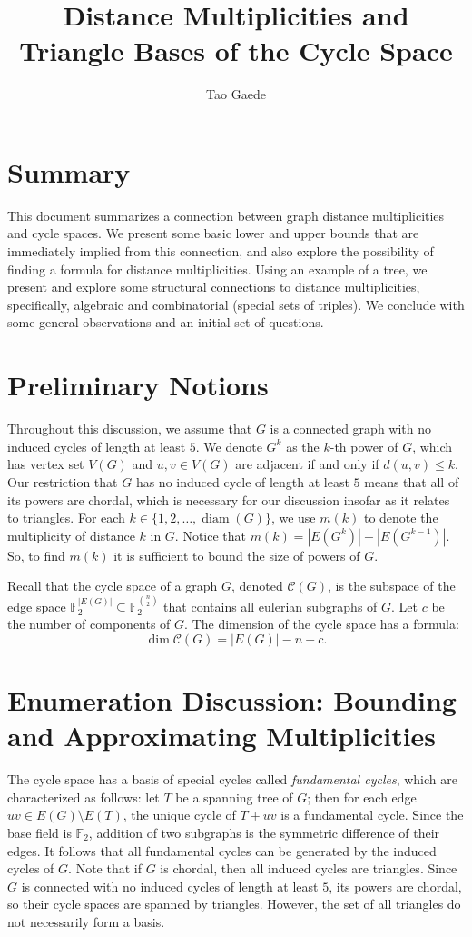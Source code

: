 \documentclass[12pt]{article}
\title{ \vspace{-3cm} Distance Multiplicities and Triangle Bases of the Cycle Space}
\author{Tao Gaede}
\DeclareMathOperator{\diam}{diam}
\theoremstyle{definition}
\begin{document}
	\maketitle

\section{Summary}

This document summarizes a connection between graph distance multiplicities and cycle spaces.  We present some basic lower and upper bounds that are immediately implied from this connection, and also explore the possibility of finding a formula for distance multiplicities.  Using an example of a tree, we present and explore some structural connections to distance multiplicities, specifically, algebraic and combinatorial (special sets of triples).  We conclude with some general observations and an initial set of questions.

\section{Preliminary Notions}

Throughout this discussion, we assume that $G$ is a connected graph with no induced cycles of length at least $5$.  We denote $G^k$ as the $k$-th power of $G$, which has vertex set $V(G)$ and $u,v \in V(G)$ are adjacent if and only if $d(u,v) \leq k$.  Our restriction that $G$ has no induced cycle of length at least $5$ means that all of its powers are chordal, which is necessary for our discussion insofar as it relates to triangles.  For each $k \in \{1, 2, \ldots, \diam(G)\}$, we use $m(k)$ to denote the multiplicity of distance $k$ in $G$.  Notice that $m(k) = |E(G^k)| - |E(G^{k-1})|$.  So, to find $m(k)$ it is sufficient to bound the size of powers of $G$.

Recall that the cycle space of a graph $G$, denoted $\mathcal{C}(G)$, is the subspace of the edge space $\mathbb{F}_2^{|E(G)|} \subseteq \mathbb{F}_2^{n \choose 2}$ that contains all eulerian subgraphs of $G$.  Let $c$ be the number of components of $G$.  The dimension of the cycle space has a formula:
$$\dim \mathcal{C}(G) =  |E(G)| - n + c.$$

\section{Enumeration Discussion: Bounding and Approximating Multiplicities}
The cycle space has a basis of special cycles called \emph{fundamental cycles}, which are characterized as follows: let $T$ be a spanning tree of $G$; then for each edge $uv \in E(G) \setminus E(T)$, the unique cycle of $T + uv$ is a fundamental cycle.  Since the base field is $\mathbb{F}_2$, addition of two subgraphs is the symmetric difference of their edges.  It follows that all fundamental cycles can be generated by the induced cycles of $G$.  Note that if $G$ is chordal, then all induced cycles are triangles.  Since $G$ is connected with no induced cycles of length at least $5$, its powers are chordal, so their cycle spaces are spanned by triangles.  However, the set of all triangles do not necessarily form a basis.
\end{document}
